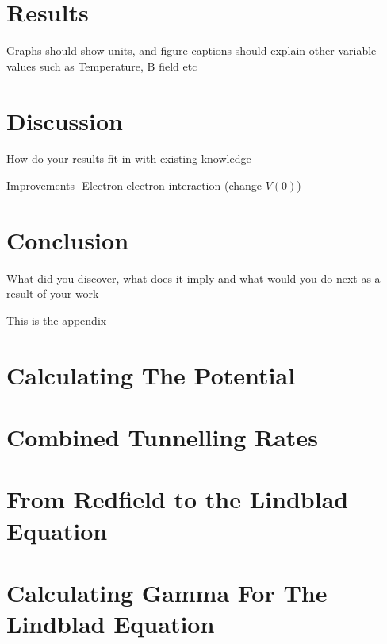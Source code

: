 \documentclass{article}
\begin{document}
\section{Results}
Graphs should show units, and figure captions should explain other variable values such as Temperature, B
field etc

\section{Discussion}
How do your results fit in with existing knowledge

Improvements
-Electron electron interaction (change \(V(0)\))


\section{Conclusion}
What did you discover, what does it imply and what would you do next as a result of your work

\printbibliography{}

\begin{appendix}
    This is the appendix
    \section{Calculating The Potential}\label{app:interaction potential calculation}
    

    \section{Combined Tunnelling Rates}\label{app:combined tunnelling rates}
    

    \section{From Redfield to the Lindblad Equation}
    

    \section{Calculating Gamma For The Lindblad Equation}
    


\end{appendix}
\end{document}
